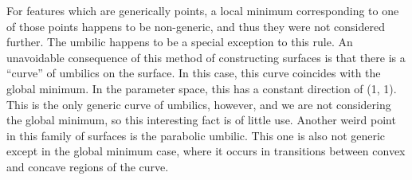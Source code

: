 \documentclass[12pt]{article}
\begin{document}
For features which are generically points, a local minimum corresponding to one of those points happens to be non-generic, and thus they were not considered further.
The umbilic happens to be a special exception to this rule.
An unavoidable consequence of this method of constructing surfaces is that there is a ``curve'' of umbilics on the surface.
In this case, this curve coincides with the global minimum.
In the parameter space, this has a constant direction of (1, 1).
This is the only generic curve of umbilics, however, and we are not considering the global minimum, so this interesting fact is of little use.
Another weird point in this family of surfaces is the parabolic umbilic.
This one is also not generic except in the global minimum case, where it occurs in transitions between convex and concave regions of the curve.\\
\end{document}
